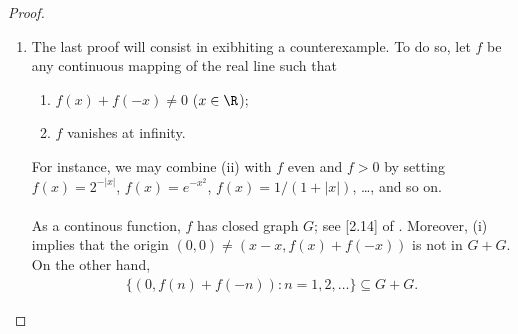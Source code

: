 \begin{proof}
\begin{enumerate}
\\
To do so, we let the variable $\mathit{a}$ range over $A$: %
Every set $a+B$ is closed as well; see Section 1.7 of \cite{FA}. %
%
Trivially, $a+B \neq c$: By Section 1.10 of \cite{FA}, %
there so exists $V=V(a)$ a neighborhood of the origin such that %
%
\begin{align}\label{separation}
  (a+B + V) \cap (c+V) = \emptyset.
\end{align}
%
Moreover, there are finitely many $a+V$, say $a_1 + V_1, a_2 + V_2, \dots$, %
whose union $U$ contains the compact set $A$. Therefore, %
%
\begin{align}\label{U + B encloses A + B}
  A+B \subseteq U + B.
\end{align}
%
Now define %
\begin{align}
  W \triangleq V_1 \cap V_2 \cap \cdots, 
\end{align}
%
so that 
%
\begin{align}
  (a_i + B + V_i) \cap (c + W) \overset{(\ref{separation})}{=} \emptyset %
  \quad (i = 1, 2, \dots).
\end{align}
%
As a conclusion, $c$ is not in the closure of $U+B$. %
Finally, (\ref{U + B encloses A + B}) asserts that %
$c$ is not in $\overline{A+B}$ either; which achieves the proof. \\
\\
\textbf{Corollary}: If $B$ is the closure of a set $S$, then %
%
\begin{align}
  A+B \subseteq \overline{A+S} \subseteq \overline{A+B} = A + B
\end{align}
%
by (b) of Section 1.13 of \cite{FA} (since $A$ is closed; %
see Section 1.12, from the same source). %
The special case $A = \{x\}$, $B=X$ %
will occur in the proof of Exercise 15 in chapter 2. %
%
\item The last proof will consist in exibhiting a counterexample. %
To do so, let $f$ be any continuous mapping of the real line such that %
\renewcommand{\labelenumii}{(\roman{enumii})} 
\begin{enumerate}
  \item $f(x) + f(\minus x) \neq 0$ \quad ($x \in \R$);
  \item $f$ vanishes at infinity. 
\end{enumerate}
For instance, we may combine (ii) with $f$ even and $f>0$ by setting %
%
  $f(x) = 2^{\minus |x|}$, %
  $f(x) = e^{\minus x^2}$, %
  $f(x) = 1/(1+|x|)$, \dots, %
%
and so on. \\
\\
As a continous function, $f$ has closed graph $G$; see [2.14] of \cite{FA}. %
%
Moreover, (i) implies that the origin %
%
  $(0, 0) \neq \left(x-x, f(x)+ f(\minus x)\right)$ %
% 
is not in $G+G$. %
%
On the other hand, 
%
\begin{align}
  \{ \left(0, f(n) + f(\minus n)\right): n=1, 2, \dots\} \subseteq G + G.
\end{align}
%


\end{enumerate}
\end{proof}
